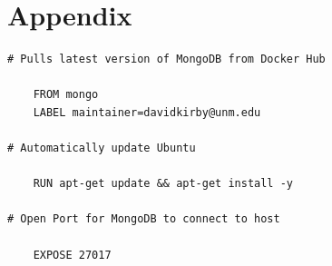 \documentclass{article}
\begin{document}
\section{Appendix}\label{sec:Appendix}

\begin{tcolorbox}[colback=CrispBlue!5!white,colframe=CrispBlue!75!black,title=Dockerfile]
\begin{verbatim}
# Pulls latest version of MongoDB from Docker Hub

    FROM mongo
    LABEL maintainer=davidkirby@unm.edu

# Automatically update Ubuntu

    RUN apt-get update && apt-get install -y

# Open Port for MongoDB to connect to host

    EXPOSE 27017
\end{verbatim}
\end{tcolorbox}
\end{document}
